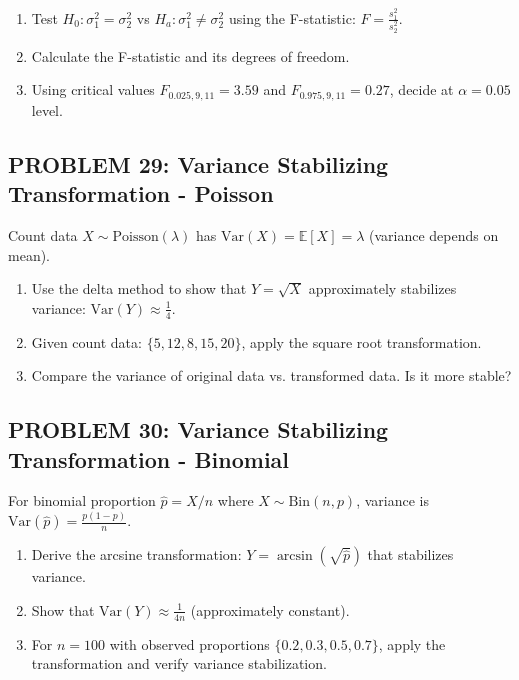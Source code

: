 \documentclass[12pt]{article}
\begin{document}
\begin{enumerate}
\item[(a)] Test \(H_0: \sigma_1^2 = \sigma_2^2\) vs \(H_a: \sigma_1^2 \neq \sigma_2^2\) using the F-statistic: \(F = \frac{s_1^2}{s_2^2}\).
\item[(b)] Calculate the F-statistic and its degrees of freedom.
\item[(c)] Using critical values \(F_{0.025,9,11} = 3.59\) and \(F_{0.975,9,11} = 0.27\), decide at \(\alpha = 0.05\) level.
\end{enumerate}

\subsection*{PROBLEM 29: Variance Stabilizing Transformation - Poisson}

Count data \(X \sim \text{Poisson}(\lambda)\) has \(\text{Var}(X) = \mathbb{E}[X] = \lambda\) (variance depends on mean).

\begin{enumerate}
\item[(a)] Use the delta method to show that \(Y = \sqrt{X}\) approximately stabilizes variance: \(\text{Var}(Y) \approx \frac{1}{4}\).
\item[(b)] Given count data: \(\{5, 12, 8, 15, 20\}\), apply the square root transformation.
\item[(c)] Compare the variance of original data vs. transformed data. Is it more stable?
\end{enumerate}

\subsection*{PROBLEM 30: Variance Stabilizing Transformation - Binomial}

For binomial proportion \(\hat{p} = X/n\) where \(X \sim \text{Bin}(n, p)\), variance is \(\text{Var}(\hat{p}) = \frac{p(1-p)}{n}\).

\begin{enumerate}
\item[(a)] Derive the arcsine transformation: \(Y = \arcsin(\sqrt{\hat{p}})\) that stabilizes variance.
\item[(b)] Show that \(\text{Var}(Y) \approx \frac{1}{4n}\) (approximately constant).
\item[(c)] For \(n = 100\) with observed proportions \(\{0.2, 0.3, 0.5, 0.7\}\), apply the transformation and verify variance stabilization.
\end{enumerate}
\end{document}
